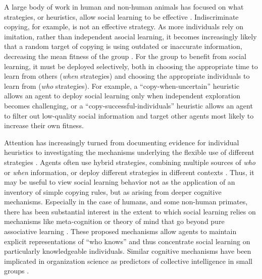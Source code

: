 \documentclass[12pt,letterpaper]{article}
\begin{document}
A large body of work in human and non-human animals has focused on what strategies, or heuristics, allow social learning to be effective \cite{laland_social_2004,hoppitt2013social,RendellFogarty___Laland11_CognitiveCulture}. 
Indiscriminate copying, for example, is not an effective strategy. 
As more individuals rely on imitation, rather than independent asocial learning, it becomes increasingly likely that a random target of copying is using outdated or inaccurate information, decreasing the mean fitness of the group \cite{rogers_does_1988,kendal2005trade,boyd1995does}.
For the group to benefit from social learning, it must be deployed selectively, both in choosing the appropriate time to learn from others (\emph{when} strategies) and choosing the appropriate individuals to learn from (\emph{who} strategies). 
For example, a ``copy-when-uncertain'' heuristic allows an agent to deploy social learning only when independent exploration becomes challenging, or a ``copy-successful-individuals'' heuristic allows an agent to filter out low-quality social information and target other agents most likely to increase their own fitness.

Attention has increasingly turned from documenting evidence for individual heuristics to investigating the mechanisms underlying the flexible use of different strategies \cite{heyes2016blackboxing,kendal2018social}. 
Agents often use hybrid strategies, combining multiple sources of \emph{who} or \emph{when} information, or deploy different strategies in different contexts \cite{mcelreath_beyond_2008}.
Thus, it may be useful to view social learning behavior not as the application of an inventory of simple copying rules, but as arising from deeper cognitive mechanisms.
Especially in the case of humans, and some non-human primates, there has been substantial interest in the extent to which social learning relies on mechanisms like meta-cognition \cite{heyes2016knows} or theory of mind \cite{shafto2012learning} that go beyond pure associative learning \cite{behrens2008associative,heyes_whats_2012,heyes2012simple}.
These proposed mechanisms allow agents to maintain explicit representations of ``who knows'' and thus concentrate social learning on particularly knowledgeable individuals.
Similar cognitive mechanisms have been implicated in organization science as predictors of collective intelligence in small groups \cite{woolley2010evidence,engel2014reading}.
\end{document}
